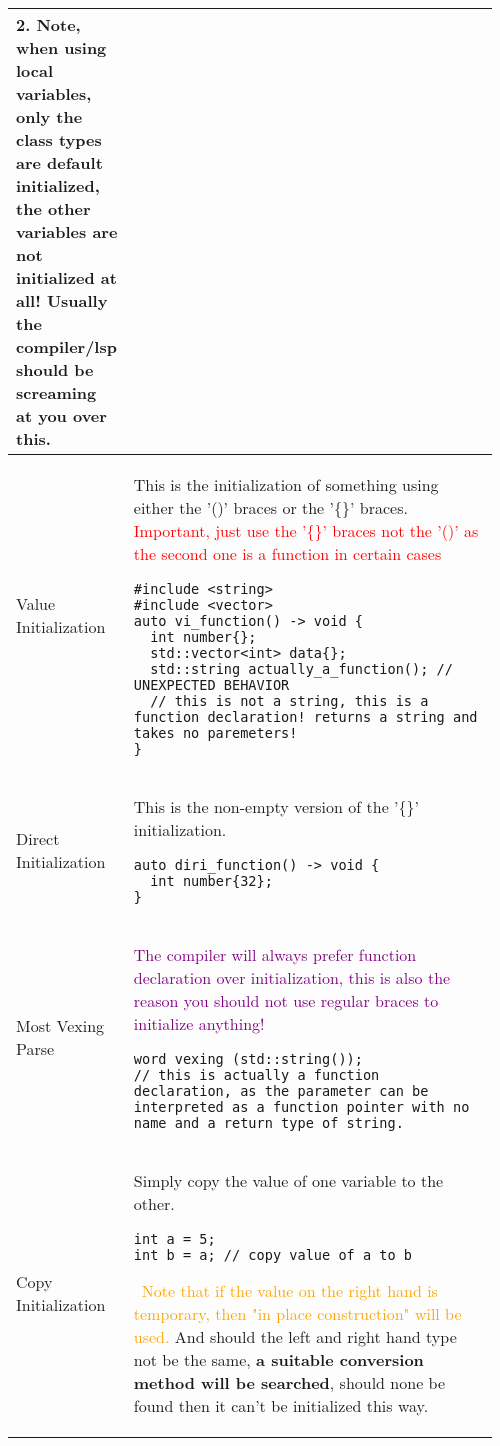 \documentclass[main.tex,fontsize=8pt,paper=a4,paper=portrait,DIV=calc,]{scrartcl}
\begin{document}
\begin{table}[ht!]
\begin{tabular}{|m{0.2\linewidth}|m{0.755\linewidth}|}
\textbf{2. Note, when using local variables, only the class types are default initialized, the other variables are not initialized at all! Usually the compiler/lsp should be screaming at you over this.}
\\
\hline
Value Initialization & 
This is the initialization of something using either the '()' braces or the '\{\}' braces.\newline
\textcolor{red}{Important, just use the '\{\}' braces not the '()' as the second one is a function in certain cases}
\begin{lstlisting}
#include <string>
#include <vector>
auto vi_function() -> void {
  int number{};
  std::vector<int> data{};
  std::string actually_a_function(); // UNEXPECTED BEHAVIOR
  // this is not a string, this is a function declaration! returns a string and takes no paremeters!
}
\end{lstlisting}
\\
\hline
Direct Initialization & 
This is the non-empty version of the '\{\}' initialization.\newline
\begin{lstlisting}
auto diri_function() -> void {
  int number{32};
}
\end{lstlisting}
\\
\hline
Most Vexing Parse & 
\textcolor{purple}{The compiler will always prefer function declaration over initialization, this is also the reason you should not use regular braces to initialize anything!}\newline
\begin{lstlisting}
word vexing (std::string());
// this is actually a function declaration, as the parameter can be interpreted as a function pointer with no name and a return type of string.
\end{lstlisting}
\\
\hline
Copy Initialization & 
Simply copy the value of one variable to the other.\newline
\begin{lstlisting}
int a = 5;
int b = a; // copy value of a to b
\end{lstlisting} 
\, \newline
\textcolor{orange}{Note that if the value on the right hand is temporary, then "in place construction" will be used.}\newline
And should the left and right hand type not be the same, \textbf{a suitable conversion method will be searched}, should none be found then it can't be initialized this way.
\\

\end{tabular}
\end{table}
\end{document}
